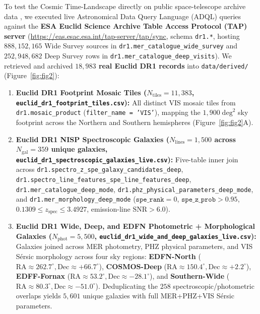 \documentclass[11pt,a4paper]{article}
\begin{document}
To test the Cosmic Time-Landscape directly on public space-telescope archive data \cite{EuclidOverview2024,EuclidDR1Archive2026}, we executed live Astronomical Data Query Language (ADQL) queries against the \textbf{ESA Euclid Science Archive Table Access Protocol (TAP) server} (\url{https://eas.esac.esa.int/tap-server/tap/sync}, schema \texttt{dr1.*}, hosting $888,152,165$ Wide Survey sources in \texttt{dr1.\allowbreak mer\_\allowbreak catalogue\_\allowbreak wide\_\allowbreak survey} and $252,948,682$ Deep Survey rows in \texttt{dr1.\allowbreak mer\_\allowbreak catalogue\_\allowbreak deep\_\allowbreak visits}). We retrieved and archived \textbf{$18,983$ real Euclid DR1 records} into \texttt{data/derived/} (Figure~\ref{fig:fig2}):
\begin{enumerate}
  \item \textbf{Euclid DR1 Footprint Mosaic Tiles ($N_{\mathrm{tiles}} = 11,383$, \texttt{euclid\_\allowbreak dr1\_\allowbreak footprint\_\allowbreak tiles.csv}):} All distinct VIS mosaic tiles from \texttt{dr1.\allowbreak mosaic\_\allowbreak product} (\texttt{filter\_name = 'VIS'}), mapping the $1,900\;\mathrm{deg}^2$ sky footprint across the Northern and Southern hemispheres (Figure~\ref{fig:fig2}A).
  \item \textbf{Euclid DR1 NISP Spectroscopic Galaxies ($N_{\mathrm{lines}} = 1,500$ across $N_{\mathrm{gal}} = 359$ unique galaxies, \texttt{euclid\_\allowbreak dr1\_\allowbreak spectroscopic\_\allowbreak galaxies\_\allowbreak live.csv}):} Five-table inner join across \texttt{dr1.\allowbreak spectro\_\allowbreak z\_\allowbreak spe\_\allowbreak galaxy\_\allowbreak candidates\_\allowbreak deep}, \texttt{dr1.\allowbreak spectro\_\allowbreak line\_\allowbreak features\_\allowbreak spe\_\allowbreak line\_\allowbreak features\_\allowbreak deep}, \texttt{dr1.\allowbreak mer\_\allowbreak catalogue\_\allowbreak deep\_\allowbreak mode}, \texttt{dr1.\allowbreak phz\_\allowbreak physical\_\allowbreak parameters\_\allowbreak deep\_\allowbreak mode}, and \texttt{dr1.\allowbreak mer\_\allowbreak morphology\_\allowbreak deep\_\allowbreak mode} ($\texttt{spe\_rank} = 0$, $\texttt{spe\_z\_prob} > 0.95$, $0.1309 \le z_{\mathrm{spec}} \le 3.4927$, emission-line $\mathrm{SNR} > 6.0$).
  \item \textbf{Euclid DR1 Wide, Deep, and EDFN Photometric + Morphological Galaxies ($N_{\mathrm{phot}} = 5,500$, \texttt{euclid\_\allowbreak dr1\_\allowbreak wide\_\allowbreak and\_\allowbreak deep\_\allowbreak galaxies\_\allowbreak live.csv}):} Galaxies joined across MER photometry, PHZ physical parameters, and VIS S\'ersic morphology across four sky regions: \textbf{EDFN-North} ($\mathrm{RA}\approx 262.7^\circ, \mathrm{Dec}\approx +66.7^\circ$), \textbf{COSMOS-Deep} ($\mathrm{RA}\approx 150.4^\circ, \mathrm{Dec}\approx +2.2^\circ$), \textbf{EDFF-Fornax} ($\mathrm{RA}\approx 53.2^\circ, \mathrm{Dec}\approx -28.1^\circ$), and \textbf{Southern-Wide} ($\mathrm{RA}\approx 80.3^\circ, \mathrm{Dec}\approx -51.0^\circ$). Deduplicating the $258$ spectroscopic/photometric overlaps yields $5,601$ unique galaxies with full MER+PHZ+VIS S\'ersic parameters.

\end{enumerate}
\end{document}
